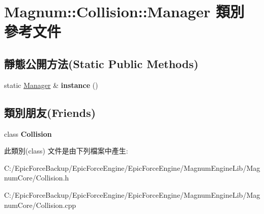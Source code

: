 \hypertarget{class_magnum_1_1_collision_1_1_manager}{}\section{Magnum\+:\+:Collision\+:\+:Manager 類別 參考文件}
\label{class_magnum_1_1_collision_1_1_manager}
\subsection*{靜態公開方法(Static Public Methods)}
\begin{DoxyCompactItemize}
\item 
static \hyperlink{class_magnum_1_1_collision_1_1_manager}{Manager} \& {\bfseries instance} ()\hypertarget{class_magnum_1_1_collision_1_1_manager_a207a47f946ceb2f3bb62476eb867eb0e}{}\label{class_magnum_1_1_collision_1_1_manager_a207a47f946ceb2f3bb62476eb867eb0e}

\end{DoxyCompactItemize}
\subsection*{類別朋友(Friends)}
\begin{DoxyCompactItemize}
\item 
class {\bfseries Collision}\hypertarget{class_magnum_1_1_collision_1_1_manager_aa08e39e5a8a0a97f10c15f0c5d98013b}{}\label{class_magnum_1_1_collision_1_1_manager_aa08e39e5a8a0a97f10c15f0c5d98013b}

\end{DoxyCompactItemize}


此類別(class) 文件是由下列檔案中產生\+:\begin{DoxyCompactItemize}
\item 
C\+:/\+Epic\+Force\+Backup/\+Epic\+Force\+Engine/\+Epic\+Force\+Engine/\+Magnum\+Engine\+Lib/\+Magnum\+Core/Collision.\+h\item 
C\+:/\+Epic\+Force\+Backup/\+Epic\+Force\+Engine/\+Epic\+Force\+Engine/\+Magnum\+Engine\+Lib/\+Magnum\+Core/Collision.\+cpp\end{DoxyCompactItemize}
